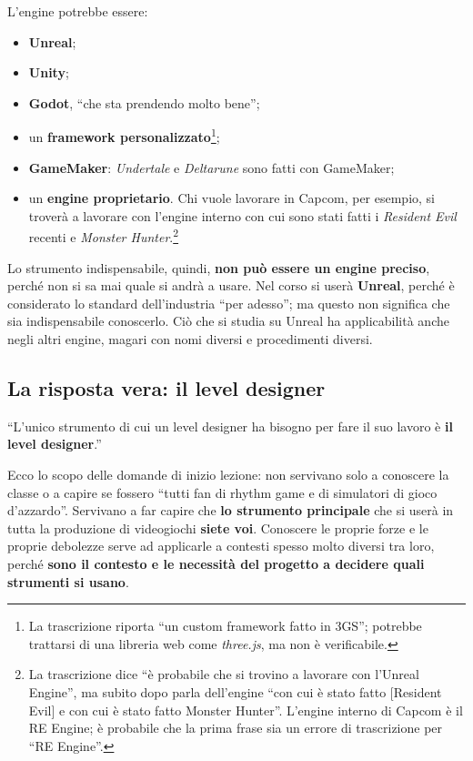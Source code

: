 L'engine potrebbe essere:
\begin{itemize}
  \item \textbf{Unreal};
  \item \textbf{Unity};
  \item \textbf{Godot}, ``che sta prendendo molto bene'';
  \item un \textbf{framework personalizzato}\footnote{La trascrizione riporta
        ``un custom framework fatto in 3GS''; potrebbe trattarsi di una
        libreria web come \emph{three.js}, ma non è verificabile.};
  \item \textbf{GameMaker}: \emph{Undertale} e \emph{Deltarune} sono fatti
        con GameMaker;
  \item un \textbf{engine proprietario}. Chi vuole lavorare in Capcom, per
        esempio, si troverà a lavorare con l'engine interno con cui sono
        stati fatti i \emph{Resident Evil} recenti e \emph{Monster
        Hunter}.\footnote{La trascrizione dice ``è probabile che si trovino a
        lavorare con l'Unreal Engine'', ma subito dopo parla dell'engine
        ``con cui è stato fatto [Resident Evil] e con cui è stato fatto Monster
        Hunter''. L'engine interno di Capcom è il RE Engine; è probabile che
        la prima frase sia un errore di trascrizione per ``RE Engine''.}
\end{itemize}
Lo strumento indispensabile, quindi, \textbf{non può essere un engine
preciso}, perché non si sa mai quale si andrà a usare. Nel corso si userà
\textbf{Unreal}, perché è considerato lo standard dell'industria ``per
adesso''; ma questo non significa che sia indispensabile conoscerlo. Ciò che
si studia su Unreal ha applicabilità anche negli altri engine, magari con nomi
diversi e procedimenti diversi.

\subsection{La risposta vera: il level designer}

``L'unico strumento di cui un level designer ha bisogno per fare il suo lavoro
è \textbf{il level designer}.''

Ecco lo scopo delle domande di inizio lezione: non servivano solo a conoscere
la classe o a capire se fossero ``tutti fan di rhythm game e di simulatori di
gioco d'azzardo''. Servivano a far capire che \textbf{lo strumento principale}
che si userà in tutta la produzione di videogiochi \textbf{siete voi}. Conoscere
le proprie forze e le proprie debolezze serve ad applicarle a contesti spesso
molto diversi tra loro, perché \textbf{sono il contesto e le necessità del
progetto a decidere quali strumenti si usano}.

